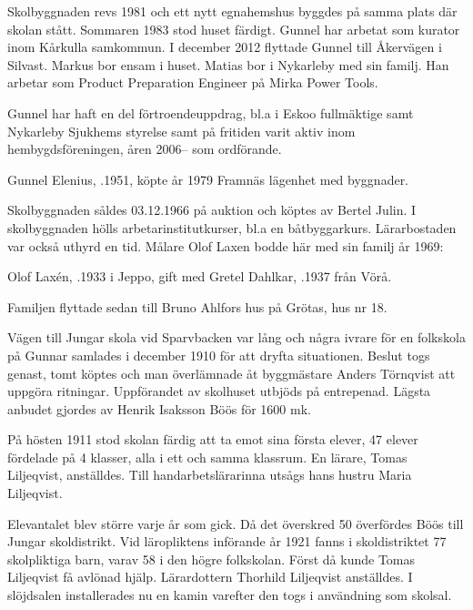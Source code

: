 Skolbyggnaden revs 1981 och ett nytt egnahemshus byggdes på samma plats där skolan stått. Sommaren 1983 stod huset färdigt. Gunnel har arbetat som kurator inom Kårkulla samkommun.	I december 2012 flyttade Gunnel till Åkervägen i Silvast. Markus bor ensam i huset. Matias bor i Nykarleby med sin familj. Han arbetar som Product Preparation Engineer på Mirka Power Tools.

Gunnel har haft en del förtroendeuppdrag, bl.a i  Eskoo fullmäktige samt Nykarleby Sjukhems styrelse samt på fritiden varit aktiv inom hembygdsföreningen, åren 2006-- som ordförande.





Gunnel Elenius, .1951, köpte år 1979 Framnäs lägenhet med byggnader.\jhvspace{}


Skolbyggnaden såldes 03.12.1966 på auktion och köptes av Bertel Julin.	I skolbyggnaden hölls arbetarinstitutkurser, bl.a en båtbyggarkurs. Lärarbostaden var också uthyrd en tid. Målare Olof Laxen bodde här med sin familj år 1969:

Olof Laxén, .1933 i Jeppo, gift med Gretel Dahlkar, .1937 från Vörå.
\begin{jhchildren}
  \item {}
  \item {}
\end{jhchildren}

Familjen flyttade sedan till Bruno Ahlfors hus på Grötas, hus nr 18.


Vägen till Jungar skola vid Sparvbacken var lång och några ivrare för en folkskola på Gunnar samlades i december 1910 för att dryfta situationen. Beslut togs genast, tomt köptes och man överlämnade åt byggmästare Anders Törnqvist att uppgöra ritningar. Uppförandet av skolhuset utbjöds på entrepenad. Lägsta anbudet gjordes av Henrik Isaksson Böös för 1600 mk.

På hösten 1911 stod skolan färdig att ta emot sina första elever, 47 elever fördelade på 4 klasser, alla i ett och samma klassrum. En lärare, Tomas Liljeqvist, anställdes. Till handarbetslärarinna utsågs hans hustru Maria Liljeqvist.

Elevantalet blev större varje år som gick. Då det överskred 50 överfördes Böös till Jungar skoldistrikt. Vid läropliktens införande år 1921 fanns i skoldistriktet 77 skolpliktiga barn, varav 58 i den högre folkskolan. Först då kunde Tomas Liljeqvist få avlönad hjälp. Lärardottern Thorhild Liljeqvist anställdes. I slöjdsalen installerades nu en kamin varefter den togs i användning som skolsal.

